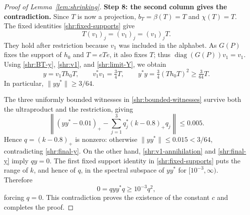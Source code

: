 \begin{proof}[Proof of Lemma~\ref{lem:shrinking}]
\medskip
\noindent\textbf{Step 8: the second column gives the contradiction.}
Since $T$ is now a projection, $b_T=\beta(T)=T$ and $\chi(T)=T$.
The fixed identities \eqref{shr:fixed-supports} give
\[
 T(v_1)_j=(v_1)_j=(v_1)_jT.
\]
They hold after restriction because $v_1$ was included in the alphabet.
As $G(P)$ fixes the support of $h_0$ and $T=eTe$, it also fixes $T$;
thus $\operatorname{diag}(G(P))v_1=v_1$.  Using
\eqref{shr:BT-y}, \eqref{shr:v1}, and \eqref{shr:limit-Y}, we obtain
\begin{equation}\label{shr:final-y}
 y=v_1Th_0T,\qquad v_1^*v_1=\tfrac34 T,\qquad
 y^*y=\tfrac34(Th_0T)^2\ge\tfrac{3}{64}T.
\end{equation}
In particular, $\|yy^*\|\ge3/64$.

The three uniformly bounded witnesses in
\eqref{shr:bounded-witnesses} survive both the ultraproduct and the
restriction, giving
\[
 \left\|(yy^*-0.01)_+-\sum_{j=1}^3q_j^*(k-0.8)_+q_j\right\|\le0.005.
\]
Hence $q=(k-0.8)_+$ is nonzero: otherwise
$\|yy^*\|\le0.015<3/64$, contradicting \eqref{shr:final-y}.
On the other hand, \eqref{shr:v1-annihilation} and
\eqref{shr:final-y} imply $qy=0$.  The first fixed support identity in
\eqref{shr:fixed-supports} puts the range of $k$, and hence of $q$, in
the spectral subspace of $yy^*$ for $[10^{-3},\infty)$.  Therefore
\[
 0=qyy^*q\ge10^{-3}q^2,
\]
forcing $q=0$.  This contradiction proves the existence of the constant
$c$ and completes the proof.
\end{proof}
